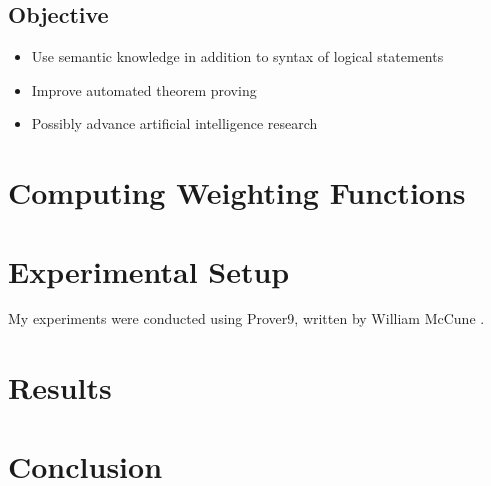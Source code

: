 \documentclass{article}
\begin{document}
	
	\subsection{Objective}
		\begin{itemize}
		    \item Use semantic knowledge in addition to syntax of logical statements
		    \item Improve automated theorem proving
		    \item Possibly advance artificial intelligence research
		\end{itemize}
	
\section{Computing Weighting Functions}

\section{Experimental Setup}
My experiments were conducted using Prover9, written by William McCune \cite{mccune2005prover9}.

\section{Results}

\section{Conclusion}


\nocite{*}

\newpage
\printbibliography
\end{document}
